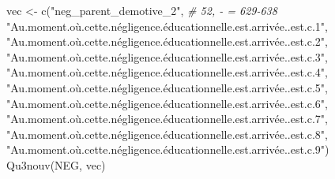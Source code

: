 \documentclass[
]{article}
\newenvironment{Shaded}{\begin{snugshade}}{\end{snugshade}}
\newcommand{\CommentTok}[1]{\textcolor[rgb]{0.56,0.35,0.01}{\textit{#1}}}
\newcommand{\FunctionTok}[1]{\textcolor[rgb]{0.00,0.00,0.00}{#1}}
\newcommand{\NormalTok}[1]{#1}
\newcommand{\OtherTok}[1]{\textcolor[rgb]{0.56,0.35,0.01}{#1}}
\newcommand{\StringTok}[1]{\textcolor[rgb]{0.31,0.60,0.02}{#1}}
\begin{document}
\begin{Shaded}
\begin{Highlighting}[]
\NormalTok{vec }\OtherTok{\textless{}{-}} \FunctionTok{c}\NormalTok{(}\StringTok{"neg\_parent\_demotive\_2"}\NormalTok{,  }\CommentTok{\# 52, {-} = 629{-}638 }
         \StringTok{"Au.moment.où.cette.négligence.éducationnelle.est.arrivée..est.c.1"}\NormalTok{,}
         \StringTok{"Au.moment.où.cette.négligence.éducationnelle.est.arrivée..est.c.2"}\NormalTok{,}
         \StringTok{"Au.moment.où.cette.négligence.éducationnelle.est.arrivée..est.c.3"}\NormalTok{,}
         \StringTok{"Au.moment.où.cette.négligence.éducationnelle.est.arrivée..est.c.4"}\NormalTok{,}
         \StringTok{"Au.moment.où.cette.négligence.éducationnelle.est.arrivée..est.c.5"}\NormalTok{,}
         \StringTok{"Au.moment.où.cette.négligence.éducationnelle.est.arrivée..est.c.6"}\NormalTok{,}
         \StringTok{"Au.moment.où.cette.négligence.éducationnelle.est.arrivée..est.c.7"}\NormalTok{,}
         \StringTok{"Au.moment.où.cette.négligence.éducationnelle.est.arrivée..est.c.8"}\NormalTok{,}
         \StringTok{"Au.moment.où.cette.négligence.éducationnelle.est.arrivée..est.c.9"}\NormalTok{)}
\FunctionTok{Qu3nouv}\NormalTok{(NEG, vec)}
\end{Highlighting}
\end{Shaded}
\end{document}

